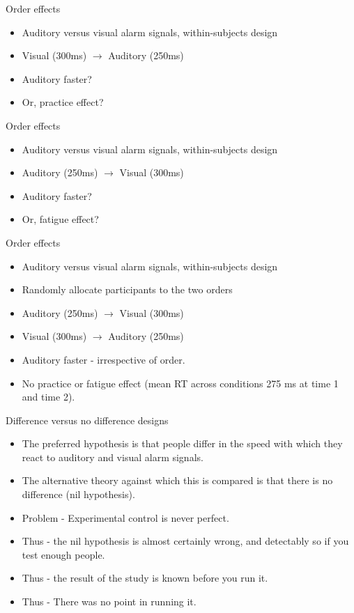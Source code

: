 \documentclass{beamer}
\begin{document}
\begin{frame}{Order effects}
\begin{itemize}
\item Auditory versus visual alarm signals, within-subjects design
\item Visual (300ms) $\to$ Auditory (250ms)
\item Auditory faster?
\item Or, practice effect?
\end{itemize}
\end{frame}


\begin{frame}{Order effects}
\begin{itemize}
\item Auditory versus visual alarm signals, within-subjects design
\item Auditory (250ms) $\to$ Visual (300ms)
\item Auditory faster?
\item Or, fatigue effect?
\end{itemize}
\end{frame}



\begin{frame}{Order effects}
\begin{itemize}
\item Auditory versus visual alarm signals, within-subjects design
\item Randomly allocate participants to the two orders
\item Auditory (250ms) $\to$ Visual (300ms)
\item Visual (300ms) $\to$ Auditory (250ms)
\item Auditory faster - irrespective of order.
\item No practice or fatigue effect (mean RT across conditions 275 ms at time 1 and time 2).
\end{itemize}
\end{frame}



\begin{frame}{Difference versus no difference designs}
\begin{itemize}
\item The preferred hypothesis is that people differ in the speed with which they react to auditory and visual alarm signals.
\item The alternative theory against which this is compared is that there is no difference (nil hypothesis).
\item Problem - Experimental control is never perfect.
\item Thus - the nil hypothesis is almost certainly wrong, and detectably so if you test enough people.
\item Thus - the result of the study is known before you run it.
\item Thus - There was no point in running it.
\end{itemize}
\end{frame}
\end{document}
